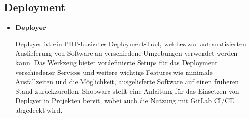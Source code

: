 \clearpage

\subsection*{Deployment}

\begin{itemize}
    \item {
        \textbf{Deployer}\par
        Deployer ist ein PHP-basiertes Deployment-Tool, welches zur automatisierten Auslieferung von Software an
        verschiedene Umgebungen verwendet werden kann.
        Das Werkzeug bietet vordefinierte Setups für das Deployment verschiedener Services und weitere wichtige
        Features wie minimale Ausfallzeiten und die Möglichkeit, ausgelieferte Software auf einen früheren Stand
        zurückzurollen.
        Shopware stellt eine Anleitung für das Einsetzen von Deployer in Projekten bereit, wobei auch die Nutzung mit
        GitLab CI/CD abgedeckt wird.
    }
\end{itemize}
